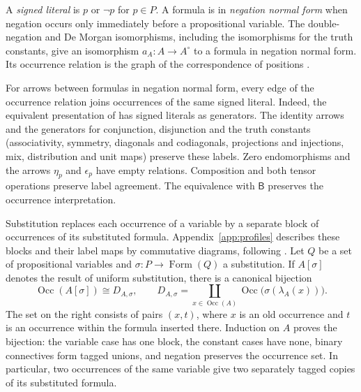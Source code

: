 \documentclass[11pt]{article}
\newcommand{\B}{\mathsf B}
\newcommand{\Occ}{\operatorname{Occ}}
\newcommand{\FormulaSet}{\operatorname{Form}}
\begin{document}
A \emph{signed literal} is $p$ or $\neg p$ for $p\in P$.
A formula is in \emph{negation normal form} when negation occurs only
immediately before a propositional variable. The double-negation and
De Morgan isomorphisms, including the isomorphisms for the truth
constants, give an isomorphism $a_A:A\to A^\circ$ to a formula in
negation normal form. Its occurrence relation is the graph of the
correspondence of positions \cite[\S14.1, pp.~313--315]{DP}.

For arrows between formulas in negation normal form, every edge of
the occurrence relation joins occurrences of the same signed literal.
Indeed, the equivalent presentation of \cite[\S14.2, pp.~318--321]{DP}
has signed literals as generators. The identity arrows and the generators
for conjunction, disjunction and the truth constants (associativity,
symmetry, diagonals and codiagonals, projections and injections, mix,
distribution and unit maps) preserve these labels. Zero endomorphisms
and the arrows $\eta_p$ and $\epsilon_p$ have empty relations. Composition and both tensor
operations preserve label agreement. The equivalence with $\B$ preserves the occurrence
interpretation.

Substitution replaces each occurrence of a variable by a separate
block of occurrences of its substituted formula.
Appendix~\ref{app:profiles} describes these blocks and their label maps
by commutative diagrams, following \cite[\S9]{Notation}.
Let $Q$ be a set of propositional variables and
$\sigma:P\to\FormulaSet(Q)$ a substitution. If $A[\sigma]$ denotes the
result of uniform substitution, there is a canonical bijection
\begin{equation}
 \Occ(A[\sigma])\cong D_{A,\sigma},\qquad
 D_{A,\sigma}=\coprod_{x\in\Occ(A)}
                  \Occ\bigl(\sigma(\lambda_A(x))\bigr).
 \label{eq:occ-substitution}
\end{equation}
The set on the right consists of pairs $(x,t)$, where $x$ is an old
occurrence and $t$ is an occurrence within the formula inserted there.
Induction on $A$ proves the bijection: the variable case has one
block, the constant cases have none, binary connectives form tagged
unions, and negation preserves the occurrence set. In particular,
two occurrences of the same variable give two separately tagged
copies of its substituted formula.
\end{document}
